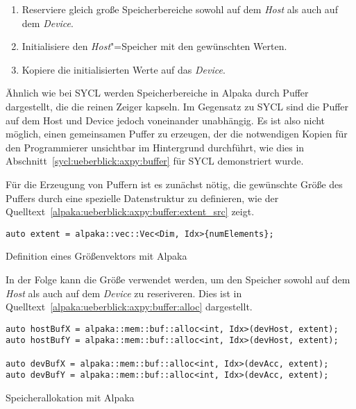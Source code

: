\begin{enumerate}
    \item Reserviere gleich große Speicherbereiche sowohl auf dem \textit{Host}
          als auch auf dem \textit{Device}.
    \item Initialisiere den \textit{Host}"=Speicher mit den gewünschten Werten.
    \item Kopiere die initialisierten Werte auf das \textit{Device}.
\end{enumerate}

Ähnlich wie bei SYCL werden Speicherbereiche in Alpaka durch Puffer dargestellt,
die die reinen Zeiger kapseln. Im Gegensatz zu SYCL sind die Puffer auf dem Host
und Device jedoch voneinander unabhängig. Es ist also nicht möglich, einen
gemeinsamen Puffer zu erzeugen, der die notwendigen Kopien für den Programmierer
unsichtbar im Hintergrund durchführt, wie dies in
Abschnitt~\ref{sycl:ueberblick:axpy:buffer} für SYCL demonstriert wurde.

Für die Erzeugung von Puffern ist es zunächst nötig, die gewünschte Größe des
Puffers durch eine spezielle Datenstruktur zu definieren, wie der
Quelltext~\ref{alpaka:ueberblick:axpy:buffer:extent_src} zeigt.

\begin{code}
    \begin{verbatim}
auto extent = alpaka::vec::Vec<Dim, Idx>{numElements};
    \end{verbatim}
    \caption{Definition eines Größenvektors mit Alpaka}
    \label{alpaka:ueberblick:axpy:buffer:extent_src}
\end{code}

In der Folge kann die Größe verwendet werden, um den Speicher sowohl auf dem
\textit{Host} als auch auf dem \textit{Device} zu reseriveren. Dies ist in
Quelltext~\ref{alpaka:ueberblick:axpy:buffer:alloc} dargestellt.

\begin{code}
    \begin{verbatim}
auto hostBufX = alpaka::mem::buf::alloc<int, Idx>(devHost, extent);
auto hostBufY = alpaka::mem::buf::alloc<int, Idx>(devHost, extent);

auto devBufX = alpaka::mem::buf::alloc<int, Idx>(devAcc, extent);
auto devBufY = alpaka::mem::buf::alloc<int, Idx>(devAcc, extent);
    \end{verbatim}
    \caption{Speicherallokation mit Alpaka}
    \label{alpaka:ueberblick:axpy:buffer:alloc}
\end{code}

